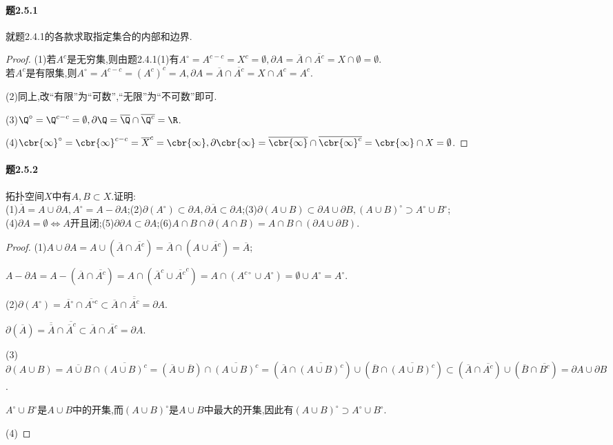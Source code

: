 \documentclass{article}
\begin{document}
\paragraph{题2.5.1}就题2.4.1的各款求取指定集合的内部和边界.
\begin{proof}
    (1)若$A^c$是无穷集,则由题2.4.1(1)有$A^\circ=A^{c-c}=X^c=\emptyset,\partial A=\overline{A}\cap \overline{A^c}=X\cap \emptyset=\emptyset$.\\
    若$A^c$是有限集,则$A^\circ=A^{c-c}=(A^c)^c=A,\partial A=\overline{A}\cap \overline{A^c}=X\cap A^c=A^c$.

    (2)同上,改``有限''为``可数'',``无限''为``不可数''即可.

    (3)$\Q^\circ=\Q^{c-c}=\emptyset,\partial\Q=\overline{\Q}\cap\overline{\Q^c}=\R$.

    (4)$\cbr{\infty}^\circ=\cbr{\infty}^{c-c}=\overline{X}^c=\cbr{\infty},\partial\cbr{\infty}=\overline{\cbr{\infty}}\cap\overline{\cbr{\infty}^c}=\cbr{\infty}\cap X=\emptyset$.
\end{proof}

\paragraph{题2.5.2}拓扑空间$X$中有$A,B\subset X$.证明:\\
(1)$\overline{A}=A\cup \partial A, A^\circ=A-\partial A$;(2)$\partial(A^\circ)\subset \partial A, \partial\overline{A}\subset \partial A$;(3)$\partial(A\cup B)\subset \partial A\cup \partial B, (A\cup B)^\circ\supset A^\circ\cup B^\circ$;\\
(4)$\partial A=\emptyset\iff A$开且闭;(5)$\partial\partial A\subset \partial A$;(6)$A\cap B\cap \partial(A\cap B)=A\cap B\cap (\partial A\cup \partial B)$.
\begin{proof}
    (1)$A\cup\partial A=A\cup(\overline{A}\cap \overline{A^c})=\overline{A}\cap(A\cup\overline{A^c})=\overline{A}$;
    
    $A-\partial A=A-(\overline{A}\cap\overline{A^c})=A\cap(\overline{A}^c\cup\overline{A^c}^c)=A\cap(A^{c\circ}\cup A^\circ)=\emptyset\cup A^\circ=A^\circ$.

    (2)$\partial(A^\circ)=\overline{A^\circ}\cap\overline{A^{\circ c}}\subset \overline{A}\cap\overline{\overline{A^c}}=\partial A$.

    $\partial(\overline{A})=\overline{\overline{A}}\cap\overline{\overline{A}^c}\subset \overline{A}\cap \overline{A^c}=\partial A$.

    (3)$\partial(A\cup B)=\overline{A\cup B}\cap\overline{(A\cup B)^c}=(\overline{A}\cup\overline{B})\cap\overline{(A\cup B)^c}=(\overline{A}\cap\overline{(A\cup B)^c})\cup(\overline{B}\cap\overline{(A\cup B)^c})\subset(\overline{A}\cap\overline{A^c})\cup(\overline{B}\cap\overline{B^c})=\partial A\cup\partial B$.

    $A^\circ\cup B^\circ$是$A\cup B$中的开集,而$(A\cup B)^\circ$是$A\cup B$中最大的开集,因此有$(A\cup B)^\circ\supset A^\circ\cup B^\circ$.

    (4)
\end{proof}
\end{document}
